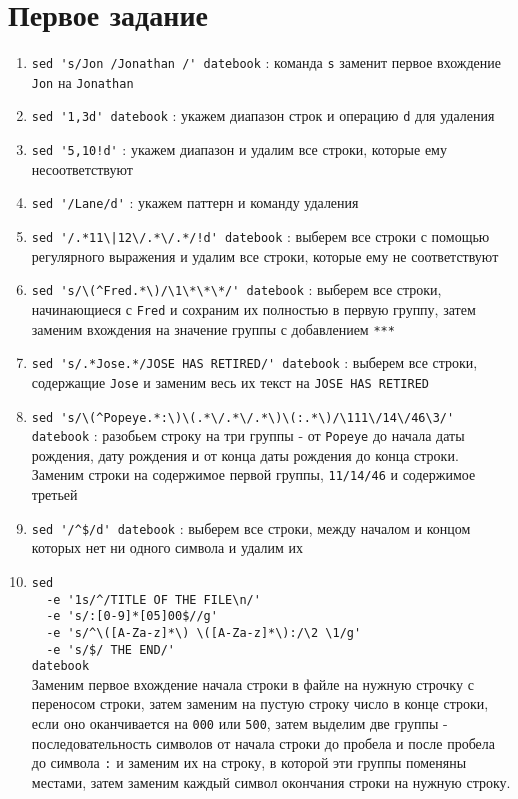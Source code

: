 \documentclass[12pt, a4paper]{article}
\begin{document}

\section*{Первое задание}
\begin{enumerate}
  \item \verb|sed 's/Jon /Jonathan /' datebook| : команда \verb|s| заменит
    первое вхождение \verb|Jon| на \verb|Jonathan|
  \item \verb|sed '1,3d' datebook| : укажем диапазон строк и операцию \verb|d|
    для удаления
  \item \verb|sed '5,10!d'| : укажем диапазон и удалим все строки, которые
    ему несоответствуют
  \item \verb|sed '/Lane/d'| : укажем паттерн и команду удаления
  \item \verb=sed '/.*11\|12\/.*\/.*/!d' datebook= : выберем все строки с помощью
    регулярного выражения и удалим все строки, которые ему не соответствуют
  \item \verb|sed 's/\(^Fred.*\)/\1\*\*\*/' datebook| : выберем все строки,
    начинающиеся с \verb|Fred| и сохраним их полностью в первую группу, затем 
    заменим вхождения на значение группы с добавлением \verb|***|
  \item \verb|sed 's/.*Jose.*/JOSE HAS RETIRED/' datebook| : выберем все строки,
    содержащие \verb|Jose| и заменим весь их текст на \verb|JOSE HAS RETIRED|
  \item \verb|sed 's/\(^Popeye.*:\)\(.*\/.*\/.*\)\(:.*\)/\111\/14\/46\3/' datebook| :
    разобьем строку на три группы - от \verb|Popeye| до начала даты рождения,
    дату рождения и от конца даты рождения до конца строки. Заменим строки на
    содержимое первой группы, \verb|11/14/46| и содержимое третьей
  \item \verb|sed '/^$/d' datebook| : выберем все строки, между началом и концом
    которых нет ни одного символа и удалим их
  \item \verb|sed|\\
        \verb|  -e '1s/^/TITLE OF THE FILE\n/'|\\
        \verb|  -e 's/:[0-9]*[05]00$//g'|\\
        \verb|  -e 's/^\([A-Za-z]*\) \([A-Za-z]*\):/\2 \1/g'|\\
        \verb|  -e 's/$/ THE END/'|\\
        \verb|datebook|\\
        Заменим первое вхождение начала строки в файле на
    нужную строчку с переносом строки, затем заменим на пустую строку
    число в конце строки, если оно оканчивается на \verb|000| или \verb|500|,
    затем выделим две группы - последовательность символов от начала строки до
    пробела и после пробела до символа \verb|:| и заменим их на строку, в
    которой эти группы поменяны местами, затем заменим каждый символ окончания
    строки на нужную строку.
\end{enumerate}
\end{document}

